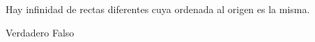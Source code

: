 Hay infinidad de rectas diferentes cuya ordenada al origen es la misma.

\begin{oneparchoices}
    \CorrectChoice Verdadero
    \choice Falso
\end{oneparchoices}